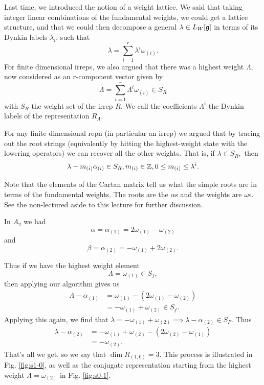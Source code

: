 Last time, we introduced the notion of a weight lattice. We said that taking integer linear combinations of the fundamental weights, we could get a lattice structure, and that we could then decompose a general $\lambda \in L_W[\mathfrak{g}]$ in terms of its Dynkin labels $\lambda_i$, such that
$$\lambda=\sum_{i=1}^r \lambda^i \omega_{(i)}.$$
For finite dimensional irreps, we also argued that there was a highest weight $\Lambda$, now considered as an $r$-component vector given by
$$\Lambda=\sum_{i=1}^r \Lambda^i \omega_{(i)}\in S_R$$
with $S_R$ the weight set of the irrep $R$. We call the coefficients $\Lambda^i$ the Dynkin labels of the representation $R_\Lambda$.

For any finite dimensional repn (in particular an irrep) we argued that by tracing out the root strings (equivalently by hitting the highest-weight state with the lowering operators) we can recover all the other weights. That is, if $\lambda \in S_R,$ then
$$\lambda-m_{(i)} \alpha_{(i)} \in S_R, m_{(i)}\in \mathbb{Z}, 0\leq m_{(i)}\leq \lambda^i.$$

Note that the elements of the Cartan matrix tell us what the simple roots are in terms of the fundamental weights. The roots are the $\alpha$s and the weights are $\omega$s. See the non-lectured aside to this lecture for further discussion.

In $A_2$ we had
 $$\alpha=\alpha_{(1)}=2\omega_{(1)}-\omega_{(2)}$$
and $$\beta=\alpha_{(2)}=-\omega_{(1)}+2\omega_{(2)}.$$

Thus if we have the highest weight element 
$$\Lambda=\omega_{(1)}\in S_f,$$ then applying our algorithm gives us
\begin{align*}
    \Lambda-\alpha_{(1)}&=\omega_{(1)}-(2\omega_{(1)}-\omega_{(2)})\\
    &=-\omega_{(1)}+\omega_{(2)} \in S_f.
\end{align*}
Applying this again, we find that
$\lambda=-\omega_{(1)}+\omega_{(2)}\implies \lambda-\alpha_{(2)} \in S_F.$ Thus
\begin{align*}
    \lambda-\alpha_{(2)}&=-\omega_{(1)}+\omega_{(2)}-(2\omega_{(2)}-\omega_{(1)})\\
    &=-\omega_{(2)}.
\end{align*}
That's all we get, so we say that $\dim R_{(1,0)}=3$. This process is illustrated in Fig. \ref{fig:s1-0}, as well as the conjugate representation starting from the highest weight $\Lambda=\omega_{(2)}$ in Fig. \ref{fig:s0-1}.

